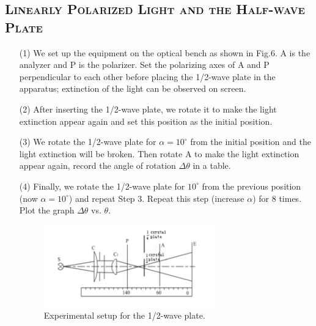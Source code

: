 \documentclass[a4paper,12pt]{article}
\begin{document}
\subsection{\textsc{Linearly Polarized Light and the Half-wave Plate}}
\begin{itemize}
\item[(1)] We set up the equipment on the optical bench as shown in Fig.6. A is the analyzer and P is the polarizer. Set the polarizing axes of A and P perpendicular to each other before placing the 1/2-wave plate in the apparatus; extinction of the light can be observed on screen.

\item[(2)] After inserting the 1/2-wave plate, we rotate it to make the light extinction appear again and set this position as the initial position.

\item[(3)] We rotate the 1/2-wave plate for $\alpha = 10^{\circ}$ from the initial position and the light extinction will be broken. Then rotate A to make the light extinction appear again, record the angle of rotation $\Delta \theta$ in a table.

\item[(4)] Finally, we rotate the 1/2-wave plate for $10^{\circ}$ from the previous position (now $\alpha = 10^{\circ}$) and repeat Step 3. Repeat this step (increase $\alpha$) for 8 times. Plot the graph $\Delta \theta$ vs. $\theta$.

\begin{figure}[h] 
    \centering
    \includegraphics[width=0.7\textwidth]{Fig6} 
    \caption{Experimental setup for the 1/2-wave plate. \cite{labmanual}} 
\end{figure}

\end{itemize}
\end{document}
